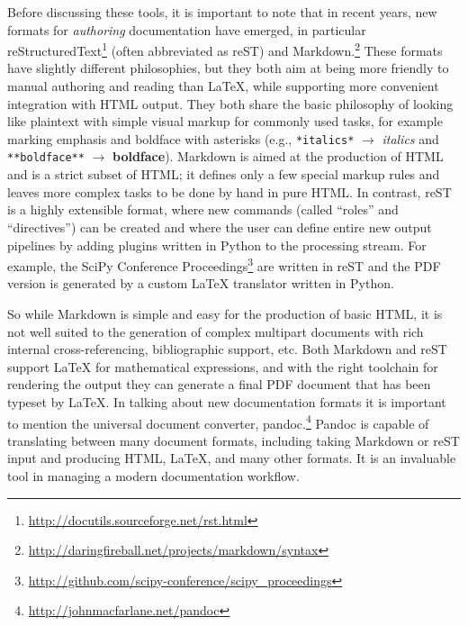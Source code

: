 \documentclass[11pt,oneside,english]{article}
\begin{document}
Before discussing these tools, it is important to note that in recent years,
new formats for \emph{authoring} documentation have emerged, in particular
reStructuredText\footnote{\url{http://docutils.sourceforge.net/rst.html}}
(often abbreviated as reST) and
Markdown.\footnote{\url{http://daringfireball.net/projects/markdown/syntax}}
These formats have slightly different philosophies, but they both aim at being
more friendly to manual authoring and reading than \LaTeX{}, while supporting
more convenient integration with HTML output.  They both share the basic
philosophy of looking like plaintext with simple visual markup for
commonly used tasks, for example marking emphasis and boldface with asterisks
(e.g., \texttt{*italics*} $\rightarrow$ \emph{italics} and
\texttt{**boldface**} $\rightarrow$ \textbf{boldface}).  Markdown is aimed at
the production of HTML and is a strict subset of HTML; it defines only a few
special markup rules and leaves more complex tasks to be done by hand in pure
HTML.  In contrast, reST is a highly extensible format, where new commands
(called ``roles'' and ``directives'') can be created and where the user can
define entire new output pipelines by adding plugins written in Python to the
processing stream. For example, the SciPy Conference
Proceedings\footnote{\url{http://github.com/scipy-conference/scipy_proceedings}} are
written in reST and the PDF version is generated by a custom \LaTeX{}
translator written in Python.

So while Markdown is simple and easy for the production of basic HTML, it
is not well suited to the generation of complex multipart documents with rich
internal cross-referencing, bibliographic support, etc.  Both Markdown and reST
support \LaTeX{} for mathematical expressions, and with the right toolchain for
rendering the output they can generate a final PDF document that has been
typeset by \LaTeX{}.  In talking about new documentation formats it is
important to mention the universal document converter,
pandoc.\footnote{\url{http://johnmacfarlane.net/pandoc}} Pandoc is capable of
translating between many document formats, including taking Markdown or reST
input and producing HTML, \LaTeX{}, and many other formats.  It is an
invaluable tool in managing a modern documentation workflow.
\end{document}

